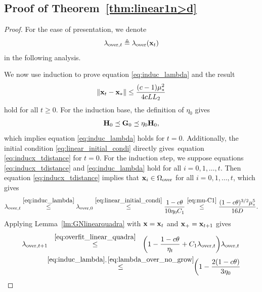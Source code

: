 \documentclass[11pt]{article}
\theoremstyle{plain}
\theoremstyle{definition}
\theoremstyle{remark}
\theoremstyle{plain}
\def\vx{{\bf{x}}}
\def\vx {{{\bf x}}}
\def\F{{\bf F}}
\def\G{{\bf G}}
\def\H{{\bf H}}
\def\x{{\bf x}}
\begin{document}
\subsection{Proof of Theorem~\ref{thm:linear1n>d}}
\label{app:proof_theorem_linear_over}
\begin{proof}
For the ease of presentation, we denote
\begin{align*}
\lambda_{\mathrm{over},t}\triangleq\lambda_{\mathrm{over}}(\x_t)
\end{align*}
in the following analysis.


We now use induction to prove equation \eqref{eq:induc_lambda} and the result
\begin{align}
\label{eq:inducx_tdistance}
\|\x_t-\x_*\|
\leq\frac{(c-1)\mu_*^2}{4cLL_2}
\end{align}
hold for all $t\geq0$.
For the induction base, 
the definition of $\eta_0$ gives
\begin{align*}
\H_0\preceq\G_0\preceq\eta_0\H_0,
\end{align*}
which implies equation \eqref{eq:induc_lambda} holds for $t=0$.
Additionally, the initial condition \eqref{eq:linear_initial_condi} directly gives~equation \eqref{eq:inducx_tdistance} for $t=0$.
For the induction step, we suppose equations 
\eqref{eq:inducx_tdistance} and \eqref{eq:induc_lambda} hold for all $i=0,1,\dots,t$.
Then equation \eqref{eq:inducx_tdistance} implies that $\x_i\in\Omega_{\mathrm{over}}$ for all $i=0,1,\dots,t$, which gives
\begin{align}\label{eq:lambda_over_no_grow}
\lambda_{\mathrm{over},t}
\overset{\eqref{eq:induc_lambda}}{\leq}\lambda_{\mathrm{over},0}
\overset{\eqref{eq:linear_initial_condi}}{\leq}
\frac{1-c\theta}{10\eta_0 C_1}
\overset{\eqref{eq:mu-C1}}{\leq} 
\frac{(1-c\theta)^{3/2}\mu_*^5}{16D}. 
\end{align}
Applying Lemma~\ref{lm:GNlinearquadra} with $\vx=\x_t$  and $\vx_+=\vx_{t+1}$ gives
\begin{align}\label{eq:lambda_over_t+1_bound}
\begin{split}
\lambda_{\mathrm{over},t+1}
&~~\overset{\eqref{eq:overfit_linear_quadra}}{\leq}~~
\biggl(1-\frac{1-c\theta}{\eta_t}
+C_1\lambda_{\mathrm{over},t}\biggr)\lambda_{\mathrm{over},t}\\
&\!\!\overset{\eqref{eq:induc_lambda},\,\eqref{eq:lambda_over_no_grow}}{\leq}\!\!\biggl(1-\frac{2(1-c\theta)}{3\eta_0}

\end{split}
\end{align}
\end{proof}
\end{document}
